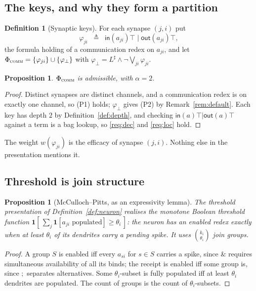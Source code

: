 \documentclass[11pt,a4paper]{article}
\theoremstyle{plain}
\newtheorem{proposition}[theorem]{Proposition}
\theoremstyle{definition}
\newtheorem{definition}[theorem]{Definition}
\theoremstyle{remark}
\newcommand{\sepc}{\mathbin{\big|}}
\newcommand{\out}{\mathsf{out}}
\newcommand{\inn}{\mathsf{in}}
\newcommand{\wmap}{w}
\begin{document}
\subsection{The keys, and why they form a partition}

\begin{definition}[Synaptic keys]
\label{def:synkeys}
For each synapse $(j,i)$ put
\[
\varphi_{ji} \;\;\triangleq\;\; \inn(a_{ji})\top \;\sepc\; \out(a_{ji})\top ,
\]
the formula holding of a communication redex on $a_{ji}$, and let
$\Phi_{\textsc{comm}} = \{\varphi_{ji}\} \cup \{\varphi_\bot\}$ with
$\varphi_\bot = L^\sharp \wedge \neg\bigvee_{ji}\varphi_{ji}$.
\end{definition}

\begin{proposition}
\label{prop:rnn-admissible}
$\Phi_{\textsc{comm}}$ is admissible, with $\alpha = 2$.
\end{proposition}

\begin{proof}
Distinct synapses are distinct channels, and a communication redex is on exactly one channel, so
(P1) holds; $\varphi_\bot$ gives (P2) by Remark~\ref{rem:default}. Each key has depth $2$ by
Definition~\ref{def:depth}, and checking $\inn(a)\top \sepc \out(a)\top$ against a term is a bag
lookup, so \ref{req:dec} and \ref{req:loc} hold.
\end{proof}

The weight $\wmap(\varphi_{ji})$ is the efficacy of synapse $(j,i)$. Nothing else in the presentation
mentions it.

\subsection{Threshold is join structure}

\begin{proposition}[McCulloch--Pitts, as an expressivity lemma]
\label{prop:mcp}
The threshold presentation of Definition~\ref{def:neuron} realises the monotone Boolean threshold
function $\mathbf{1}[\,\sum_{j} \mathbf{1}[a_{ji}\text{ populated}] \geq \theta_i\,]$: the neuron has
an enabled redex exactly when at least $\theta_i$ of its dendrites carry a pending spike. It uses
$\binom{k_i}{\theta_i}$ join groups.
\end{proposition}

\begin{proof}
A group $S$ is enabled iff every $a_{si}$ for $s \in S$ carries a spike, since $\&$ requires
simultaneous availability of all its binds; the receipt is enabled iff some group is, since $;$
separates alternatives. Some $\theta_i$-subset is fully populated iff at least $\theta_i$ dendrites
are populated. The count of groups is the count of $\theta_i$-subsets.
\end{proof}
\end{document}
